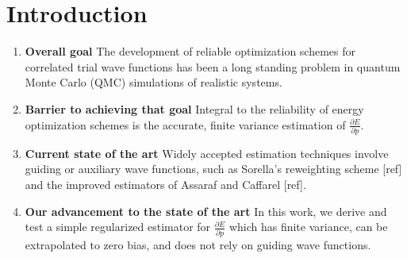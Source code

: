 \documentclass{article}
\begin{document}
\section{Introduction}
\begin{enumerate}
\item \textbf{Overall goal } The development of reliable optimization schemes for correlated trial wave functions has been a long standing problem in quantum Monte Carlo (QMC) simulations of realistic systems.

\item \textbf{Barrier to achieving that goal } Integral to the reliability of energy optimization schemes is the accurate, finite variance estimation of $\frac{\partial E}{\partial p}$.

\item \textbf{Current state of the art} Widely accepted estimation techniques involve guiding or auxiliary wave functions, such as Sorella's reweighting scheme [ref] and the improved estimators of Assaraf and Caffarel [ref].

\item \textbf{Our advancement to the state of the art } In this work, we derive and test a simple regularized estimator for $\frac{\partial E}{\partial p}$ which has finite variance, can be extrapolated to zero bias, and does not rely on guiding wave functions.
\end{enumerate}
\end{document}
